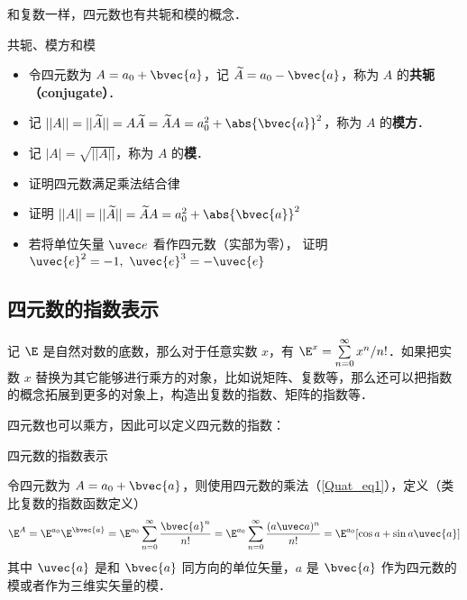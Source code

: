 和复数一样，四元数也有共轭和模的概念．

\begin{definition}{共轭、模方和模}
\begin{itemize}
\item 令四元数为 $A=a_0+\bvec{a}$，记 $\widetilde{A}=a_0-\bvec{a}$，称为 $A$ 的\textbf{共轭（conjugate）}．
\item 记 $||A||=||\widetilde{A}||=A\widetilde{A}=\widetilde{A}A=a_0^2+ \abs{\bvec{a}}^2$，称为 $A$ 的\textbf{模方}．
\item 记 $|A|=\sqrt{||A||}$，称为 $A$ 的\textbf{模}．
\end{itemize}
\end{definition}

\begin{exercise}{}\label{Quat_exe1}
\begin{itemize}
\item 证明四元数满足乘法结合律
\item 证明 $||A||=||\widetilde{A}||=\widetilde{A}A=a_0^2 + \abs{\bvec{a}}^2$
\item 若将单位矢量 $\uvec e$ 看作四元数（实部为零）， 证明 $\uvec{e}^2=-1,\ \uvec{e}^3=-\uvec{e}$
\end{itemize}
\end{exercise}

\subsection{四元数的指数表示}

记 $\E$ 是自然对数的底数，那么对于任意实数 $x$，有 $\E^x = \sum^\infty\limits_{n=0} x^n / n!$．如果把实数 $x$ 替换为其它能够进行乘方的对象，比如说矩阵、复数等，那么还可以把指数的概念拓展到更多的对象上，构造出复数的指数、矩阵的指数等．

四元数也可以乘方，因此可以定义四元数的指数：

\begin{definition}{四元数的指数表示}

令四元数为 $A=a_0+\bvec{a}$，则使用四元数的乘法（\autoref{Quat_eq1}），定义（类比复数的指数函数定义）
\begin{equation}
\E^A=\E^{a_0}\E^{\bvec{a}}=\E^{a_0}\sum^\infty\limits_{n=0}\frac{\bvec{a}^n}{n!}=\E^{a_0}\sum^\infty\limits_{n=0}\frac{(a \uvec a)^n}{n!}=\E^{a_0}[\cos{a}+\sin a \uvec{a}]
\end{equation}
其中 $\uvec{a}$ 是和 $\bvec{a}$ 同方向的单位矢量，$a$ 是 $\bvec{a}$ 作为四元数的模或者作为三维实矢量的模．
\end{definition}

